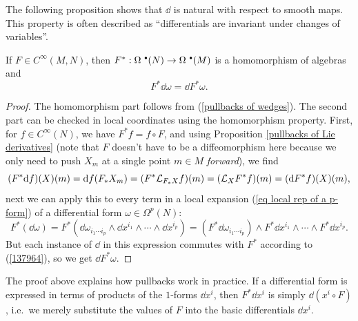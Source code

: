 The following proposition shows that $\dd$ is natural with respect to smooth maps. This property is often described as ``differentials are invariant under changes of variables''.

\begin{prop}
    If $F\in C^\infty(M,N)$, then $F^\ast:\Omega^{\smbullet }(N)\to\Omega^{\smbullet }(M)$ is a homomorphism of algebras and
    \[F^\ast \dd\omega=\dd F^\ast\omega.\]
\end{prop}
\begin{proof}
    The homomorphism part follows from (\ref{pullbacks of wedges}). The second part can be checked in local coordinates using the homomorphism property. First, for $f\in C^\infty(N)$, we have $F^\ast f=f\circ F$, and using Proposition \ref{pullbacks of Lie derivatives} (note that $F$ doesn't have to be a diffeomorphism here because we only need to push $X_m$ at a single point $m\in M$ \emph{forward}), we find
    \[(F^\ast {\mathrm{d}} f)(X)(m)={\mathrm{d}} f(F_\ast X_m)=(F^\ast \mathcal{L}_{F_\ast X}f)(m)=(\mathcal{L}_X F^\ast f)(m)=({\mathrm{d}} F^\ast f)(X)(m),\label{137964}\]
    next we can apply this to every term in a local expansion (\ref{eq local rep of a p-form}) of a differential form $\omega\in\Omega^p(N)$:
    \[F^\ast(\dd\omega)=F^\ast(\dd\omega_{i_1\cdots i_p}\wedge \dd x^{i_1}\wedge\cdots \wedge \dd x^{i_p})=(F^\ast\dd\omega_{i_1\cdots i_p})\wedge F^\ast \dd x^{i_1}\wedge\cdots\wedge F^\ast \dd x^{i_p}.\]
    But each instance of $\dd$ in this expression commutes with $F^\ast$ according to (\ref{137964}), so we get $\dd F^\ast\omega$.
\end{proof}

\begin{rem}
    The proof above explains how pullbacks work in practice. If a differential form is expressed in terms of products of the $1$-forms $\dd x^i$, then $F^\ast\dd x^i$ is simply $\dd (x^i\circ F)$, i.e.\ we merely substitute the values of $F$ into the basic differentials $\dd x^i$.
\end{rem}

